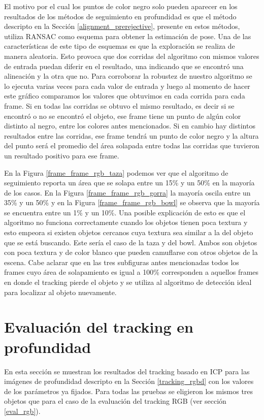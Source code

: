 El motivo por el cual los puntos de color negro solo pueden aparecer en los resultados de los métodos de seguimiento en profundidad es que el método descripto en la Sección \ref{alignment_prerejective}, presente en estos métodos, utiliza RANSAC como esquema para obtener la estimación de pose. Una de las características de este tipo de esquemas es que la exploración se realiza de manera aleatoria. Esto provoca que dos corridas del algoritmo con mismos valores de entrada puedan diferir en el resultado, una indicando que se encontró una alineación y la otra que no. Para corroborar la robustez de nuestro algoritmo se lo ejecuta varias veces para cada valor de entrada y luego al momento de hacer este gráfico comparamos los valores que obtuvimos en cada corrida para cada frame. Si en todas las corridas se obtuvo el mismo resultado, es decir si se encontró o no se encontró el objeto, ese frame tiene un punto de algún color distinto al negro, entre los colores antes mencionados. Si en cambio hay distintos resultados entre las corridas, ese frame tendrá un punto de color negro y la altura del punto será el promedio del área solapada entre todas las corridas que tuvieron un resultado positivo para ese frame.


En la Figura \ref{frame_frame_rgb_taza} podemos ver que el algoritmo de seguimiento reporta un área que se solapa entre un 15\% y un 50\% en la mayoría de los casos. En la Figura \ref{frame_frame_rgb_gorra} la mayoría oscila entre un 35\% y un 50\% y en la Figura \ref{frame_frame_rgb_bowl} se observa que la mayoría se encuentra entre un 1\% y un 10\%. Una posible explicación de esto es que el algoritmo no funciona correctamente cuando los objetos tienen poca textura y esto empeora si existen objetos cercanos cuya textura sea similar a la del objeto que se está buscando. Este sería el caso de la taza y del bowl. Ambos son objetos con poca textura y de color blanco que pueden camuflarse con otros objetos de la escena.
Cabe aclarar que en las tres subfiguras antes mencionadas todos los frames cuyo área de solapamiento es igual a 100\% corresponden a aquellos frames en donde el tracking pierde el objeto y se utiliza al algoritmo de detección ideal para localizar al objeto nuevamente.

\section{Evaluación del tracking en profundidad}
En esta sección se muestran los resultados del tracking basado en ICP para las imágenes de profundidad descripto en la Sección \ref{tracking_rgbd} con los valores de los parámetros ya fijados. Para todas las pruebas se eligieron los mismos tres objetos que para el caso de la evaluación del tracking RGB (ver sección \ref{eval_rgb}).

